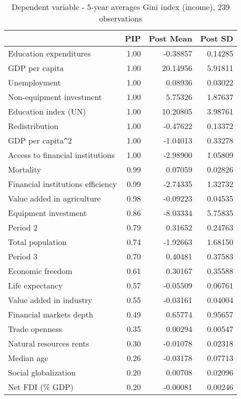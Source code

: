 \documentclass[a4paper,11pt]{article}
\begin{document}
\begin{table}[!ht]
    \footnotesize
    \centering
    \caption{Dependent variable - 5-year averages Gini index (income), 239 observations}
    \label{table:gini1y}
    \begin{tabular}{lrrr}
      \toprule
      & PIP & Post Mean & Post SD \\
      \hline
      Education expenditures & 1.00 & -0.38857 & 0.14285 \\
  GDP per capita & 1.00 & 20.14956 & 5.91811 \\
  Unemployment & 1.00 & 0.08936 & 0.03022 \\
  Non-equipment investment & 1.00 & 5.75326 & 1.87637 \\
  Education index (UN) & 1.00 & 10.20805 & 3.98761 \\ 
  Redistribution & 1.00 & -0.47622 & 0.13372 \\
  GDP per capita\verb|^|2 & 1.00 & -1.04013 & 0.33278 \\ 
  Access to financial institutions & 1.00 & -2.98900 & 1.05809 \\ 
  Mortality & 0.99 & 0.07059 & 0.02826 \\ 
  Financial institutions efficiency & 0.99 & -2.74335 & 1.32732 \\ 
  Value added in agriculture & 0.98 & -0.09223 & 0.04535 \\
  Equipment investment & 0.86 & -8.03334 & 5.75835 \\ 
  Period 2 & 0.79 & 0.31652 & 0.24763 \\
  Total population & 0.74 & -1.92663 & 1.68150 \\
  Period 3 & 0.70 & 0.40481 & 0.37583 \\ 
  Economic freedom & 0.61 & 0.30167 & 0.35588 \\ 
  Life expectancy & 0.57 & -0.05509 & 0.06761 \\
  Value added in industry & 0.55 & -0.03161 & 0.04004 \\ 
  Financial markets depth & 0.49 & 0.65774 & 0.95657 \\
  Trade openness & 0.35 & 0.00294 & 0.00547 \\
  Natural resources rents & 0.30 & -0.01078 & 0.02318 \\ 
  Median age & 0.26 & -0.03178 & 0.07713 \\ 
  Social globalization & 0.20 & 0.00708 & 0.02096 \\ 
  Net FDI (\% GDP) & 0.20 & -0.00081 & 0.00246 \\ 

\end{tabular}
\end{table}
\end{document}

